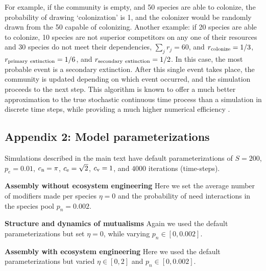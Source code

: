\documentclass[twocolumn,preprintnumbers,amsmath,amssymb,superscriptaddress,linenumbers]{revtex4-1}
\newcommand{\rr}[1]{{\rm #1}}
\begin{document}
For example, if the community is empty, and 50 species are able to colonize, the probability of drawing `colonization' is 1, and the colonizer would be randomly drawn from the 50 capable of colonizing.
Another example: if 20 species are able to colonize, 10 species are not superior competitors on any one of their resources and 30 species do not meet their dependencies, $\sum_j{r_j} = 60$, and $r_\rr{colonize} = 1/3$, $r_\rr{primary~extinction} = 1/6$, and $r_\rr{secondary~extinction} = 1/2$.
In this case, the most probable event is a secondary extinction.
After this single event takes place, the community is updated depending on which event occurred, and the simulation proceeds to the next step.
This algorithm is known to offer a much better approximation to the true stochastic continuous time process than a simulation in discrete time steps, while providing a much higher numerical efficiency \cite{Gillespie1977}.


\subsection*{Appendix 2: Model parameterizations}
Simulations described in the main text have default parameterizations of $S=200$, $p_e=0.01$, $c_{\rm n} = \pi$, $c_{\rm e} = \sqrt{2}$, $c_{\rm v} = 1$, and $4000$ iterations (time-steps).

\noindent \textbf{Assembly without ecosystem engineering} Here we set the average number of modifiers made per species $\eta = 0$ and the probability of need interactions in the species pool $p_n=0.002$.

\noindent \textbf{Structure and dynamics of mutualisms} Again we used the default parameterizations but set $\eta = 0$, while varying $p_n \in [0,0.002]$.

\noindent \textbf{Assembly with ecosystem engineering} Here we used the default parameterizations but varied $\eta \in [0,2]$ and $p_n \in [0,0.002]$.
\end{document}
